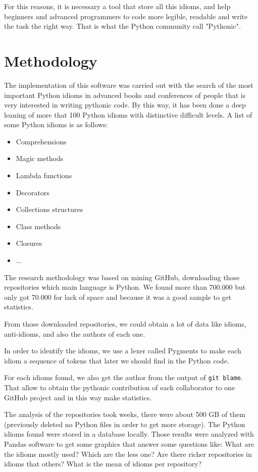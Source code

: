 \documentclass[conference]{IEEEtran}
\begin{document}
For this reasons, it is necessary a tool that store all this idioms, and help beginners and advanced programmers to code more legible, readable and write the task the right way. That is what the Python community call "Pythonic".

\section{Methodology}

The implementation of this software was carried out with the search of the most important Python idioms in advanced books and conferences of people that is very interested in writing pythonic code. By this way, it has been done a deep leaning of more that 100 Python idioms with distinctive difficult levels. A list of some Python idioms is as follows:

\begin{itemize}
\item Comprehensions
\item Magic methods
\item Lambda functions
\item Decorators
\item Collections structures
\item Class methods
\item Closures
\item ...
\end{itemize}

The research methodology was based on mining GitHub, downloading those repositories which main language is Python. We found more than 700.000 but only got 70.000 for lack of space and because it was a good sample to get statistics.

From those downloaded repositories, we could obtain a lot of data like idioms, anti-idioms, and also the authors of each one.

In order to identify the idioms, we use a lexer called Pygments to make each idiom a sequence of tokens that later we should find in the Python code.

For each idioms found, we also get the author from the output of \texttt{git blame}. That allow to obtain the pythonic contribution of each collaborator to one GitHub project and in this way make statistics.

The analysis of the repositories took weeks, there were about 500 GB of them (previously deleted no Python files in order to get more storage). The Python idioms found were stored in a database locally. Those results were analyzed with Pandas software to get some graphics that answer some questions like: What are the idioms mostly used? Which are the less one? Are there richer repositories in idioms that others? What is the mean of idioms per repository?
\end{document}
